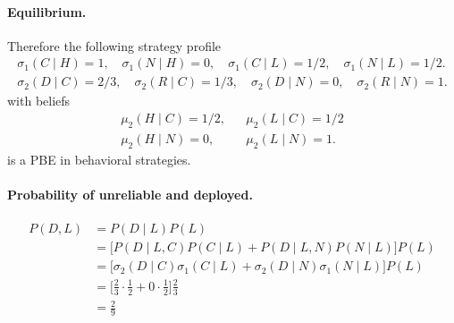 \documentclass[11pt]{exam}
\begin{document}
\begin{questions}
\begin{parts}
        \paragraph{Equilibrium.}
        Therefore the following strategy profile
        \begin{align*}
            \sigma_1(C\mid H) = 1, \quad \sigma_1(N\mid H) = 0,\quad \sigma_1(C\mid L) = 1/2,\quad \sigma_1(N\mid L) = 1/2.\\
            \sigma_2(D\mid C) = 2/3, \quad \sigma_2(R\mid C) = 1/3,\quad \sigma_2(D\mid N) = 0,\quad \sigma_2(R\mid N) = 1.
        \end{align*}
        with beliefs
        \begin{align*}
            \mu_2(H\mid C) = 1/2, && \mu_2(L\mid C) = 1/2\\
             \mu_2(H\mid N) = 0,&& \mu_2(L\mid N) = 1.
        \end{align*}
        is a PBE in behavioral strategies.

        \paragraph{Probability of unreliable and deployed.}
        \begin{align*}
            P(D, L) &= P(D\mid L)P(L)\\
            & = \big[P(D\mid L,C)P(C\mid L) + P(D\mid L,N)P(N\mid L)\big]P(L) \tag{law of total probability}\\
            &= \big[\sigma_2(D\mid C)\sigma_1(C\mid L) + \sigma_2(D\mid N)\sigma_1(N\mid L)\big]P(L) \tag{plugging in strategy profiles}\\
            &= \big[\tfrac23\cdot \tfrac12 + 0\cdot\tfrac12\big]\tfrac23\\
            &=\tfrac{2}{9}
        \end{align*}
    \end{parts}

    \begin{parts}

\end{parts}
\end{questions}
\end{document}
